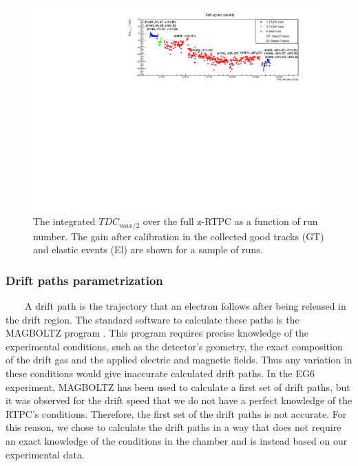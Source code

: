 \begin{figure}[tpb]
\hspace{-0.3in}
\includegraphics[scale=0.9]{fig_rtpc/updates/TDCmax2-run-number.pdf}
\caption{ The integrated $TDC_{max/2}$ over the full z-RTPC as a function of 
run number.  The gain after calibration in the collected good tracks (GT) and 
elastic events (El) are shown for a sample of runs.}
\label{fig:Drift_run_number}
\end{figure} 

\subsubsection{Drift paths parametrization}
~~~~A drift path is the trajectory that an electron follows after being 
released in the drift region. The standard software to calculate these paths is 
the MAGBOLTZ program \cite{MAGBOLTZ}. This program requires precise knowledge 
of the experimental conditions, such as the detector's geometry, the exact 
composition of the drift gas and the applied electric and magnetic fields. Thus 
any variation in these conditions would give inaccurate calculated drift paths.  
In the EG6 experiment, MAGBOLTZ has been used to calculate a first set of drift 
paths, but it was observed for the drift speed that we do not have a perfect 
knowledge of the RTPC's conditions. Therefore, the first set of the drift paths 
is not accurate. For this reason, we chose to calculate the drift paths in a 
way that does not require an exact knowledge of the conditions in the chamber 
and is instead based on our experimental data.  \\

